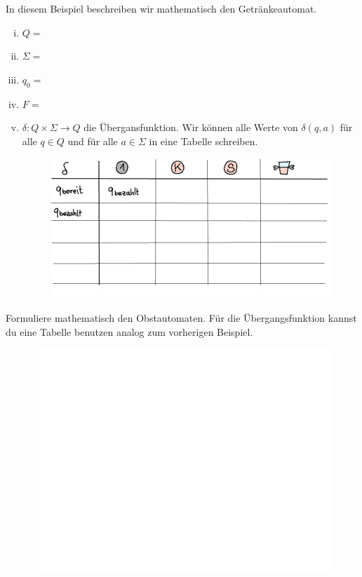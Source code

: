 \documentclass{article}
\begin{document}
\begin{example}
In diesem Beispiel beschreiben wir mathematisch den Getränkeautomat.
{ 
\begin{enumerate}[(i)]
    \item \(Q =\) \blank[width=0.5\linewidth]{}
    \item \(\Sigma =\) \blank[width=0.5\linewidth]{}
    \item \(q_0 =\) \blank[width=0.5\linewidth]{}
    \item \(F =\) \blank[width=0.5\linewidth]{}
    \item \(\delta:Q \times \Sigma \rightarrow Q \) die Übergansfunktion.
    Wir können alle Werte von \(\delta(q,a)\) für alle \(q \in Q\) und für alle \(a \in \Sigma\) in eine Tabelle schreiben.
        \begin{figure}[H]
\centering
\includegraphics[width=\linewidth]{Pictures/Getraenkeautomat_table.png} 
\end{figure}
\end{enumerate}
}
\end{example}

\begin{exercise}
Formuliere mathematisch den Obstautomaten. Für die Übergangsfunktion kannst du eine Tabelle benutzen analog zum vorherigen Beispiel.
\begin{figure}[H]
\centering
\includegraphics[width=\linewidth]{Pictures/weiss.png} 
\end{figure}
\end{exercise}
\end{document}
